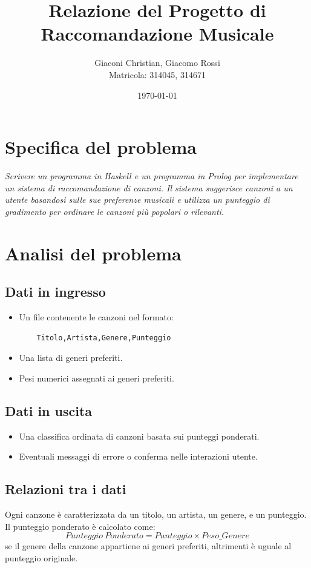 \documentclass[a4paper,11pt]{article}
\title{\textbf{Relazione del Progetto di Raccomandazione Musicale}}
\author{Giaconi Christian, Giacomo Rossi\\Matricola: 314045, 314671}
\date{\today}
\begin{document}
\maketitle

\newpage
\tableofcontents

\newpage
\section{Specifica del problema}
\itshape
Scrivere un programma in Haskell e un programma in Prolog per implementare un sistema di raccomandazione di canzoni. Il sistema suggerisce canzoni a un utente basandosi sulle sue preferenze musicali e utilizza un punteggio di gradimento per ordinare le canzoni più popolari o rilevanti.

\newpage
\section{Analisi del problema}
\subsection{Dati in ingresso}
\begin{itemize}
    \item Un file contenente le canzoni nel formato:
    \begin{verbatim}
    Titolo,Artista,Genere,Punteggio
    \end{verbatim}
    \item Una lista di generi preferiti.
    \item Pesi numerici assegnati ai generi preferiti.
\end{itemize}

\subsection{Dati in uscita}
\begin{itemize}
    \item Una classifica ordinata di canzoni basata sui punteggi ponderati.
    \item Eventuali messaggi di errore o conferma nelle interazioni utente.
\end{itemize}

\subsection{Relazioni tra i dati}
Ogni canzone è caratterizzata da un titolo, un artista, un genere, e un punteggio. Il punteggio ponderato è calcolato come:
\[
Punteggio\ Ponderato = Punteggio \times Peso\_{Genere}
\]
se il genere della canzone appartiene ai generi preferiti, altrimenti è uguale al punteggio originale.
\end{document}
